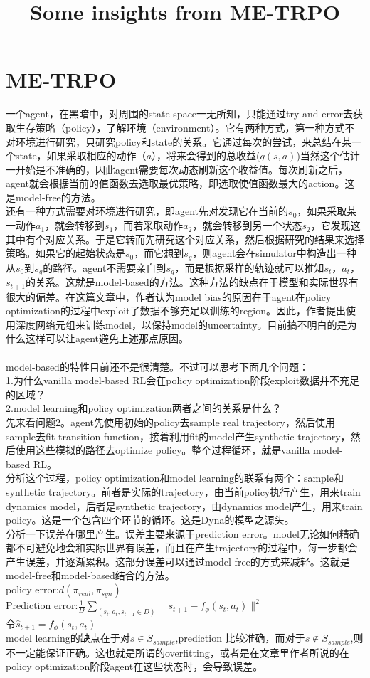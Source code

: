 \documentclass[2pt,a4paper]{article}
\title{Some insights from ME-TRPO}
\begin{document}
\section{ME-TRPO}
一个agent，在黑暗中，对周围的state space一无所知，只能通过try-and-error去获取生存策略（policy），了解环境（environment）。它有两种方式，第一种方式不对环境进行研究，只研究policy和state的关系。它通过每次的尝试，来总结在某一个state，如果采取相应的动作（$a$），将来会得到的总收益($q(s,a)$)当然这个估计一开始是不准确的，因此agent需要每次动态刷新这个收益值。每次刷新之后，agent就会根据当前的值函数去选取最优策略，即选取使值函数最大的action。这是model-free的方法。\\
还有一种方式需要对环境进行研究，即agent先对发现它在当前的$s_0$，如果采取某一动作$a_1$，就会转移到$s_1$，而若采取动作$a_2$，就会转移到另一个状态$s_2$，它发现这其中有个对应关系。于是它转而先研究这个对应关系，然后根据研究的结果来选择策略。如果它的起始状态是$s_0$，而它想到$s_g$，则agent会在simulator中构造出一种从$s_0$到$s_g$的路径。agent不需要亲自到$s_g$，而是根据采样的轨迹就可以推知$s_t$，$a_t$，$s_{t+1}$的关系。这就是model-based的方法。这种方法的缺点在于模型和实际世界有很大的偏差。在这篇文章中，作者认为model bias的原因在于agent在policy optimization的过程中exploit了数据不够充足以训练的region。因此，作者提出使用深度网络元组来训练model，以保持model的uncertainty。目前搞不明白的是为什么这样可以让agent避免上述那点原因。\\\\
model-based的特性目前还不是很清楚。不过可以思考下面几个问题：\\
1.为什么vanilla model-based RL会在policy optimization阶段exploit数据并不充足的区域？\\
2.model learning和policy optimization两者之间的关系是什么？\\
先来看问题2。agent先使用初始的policy去sample real trajectory，然后使用sample去fit transition function，接着利用fit的model产生synthetic trajectory，然后使用这些模拟的路径去optimize policy。整个过程循环，就是vanilla model-based RL。\\
分析这个过程，policy optimization和model learning的联系有两个：sample和synthetic trajectory。前者是实际的trajectory，由当前policy执行产生，用来train dynamics model，后者是synthetic trajectory，由dynamics model产生，用来train policy。这是一个包含四个环节的循环。这是Dyna的模型之源头。\\
分析一下误差在哪里产生。误差主要来源于prediction error。model无论如何精确都不可避免地会和实际世界有误差，而且在产生trajectory的过程中，每一步都会产生误差，并逐渐累积。这部分误差可以通过model-free的方式来减轻。这就是model-free和model-based结合的方法。\\
policy error:$d(\pi_{real},\pi_{syn})$\\
Prediction error:$\frac{1}{D}\sum_{(s_t,a_t,s_{t+1}\in{D})}\parallel{s_{t+1}-f_{\phi}(s_t,a_t)}\parallel^2$\\
令$\hat{s}_{t+1}=f_{\phi}(s_t,a_t)$\\
model learning的缺点在于对$s\in{S_{sample}}$,prediction 比较准确，而对于$s\notin{S_{sample}}$,则不一定能保证正确。这也就是所谓的overfitting，或者是在文章里作者所说的在policy optimization阶段agent在这些状态时，会导致误差。
\end{document}
